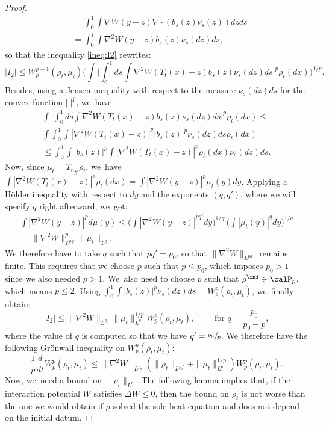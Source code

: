 \begin{proof}
\begin{align*}
& = \int_0^1 \int \nabla W(y-z) \nabla \cdot (b_s(z) \nu_s(z)) dz ds \\
& = \int_0^1 \int \nabla^2 W(y-z) b_s(z) \nu_s(dz) ds,
\end{align*}
so that the inequality \eqref{ineq:I2} rewrites:
\[
|I_2| \leq W_p^{p-1}(\rho_t, \mu_t) \bigg( \int \bigg| \int_0^1 ds \int \nabla^2 W(T_t(x) - z) b_s(z) \nu_s(dz) ds \bigg|^p \rho_t(dx)\bigg)^{1/p}.
\]
Besides, using a Jensen inequality with respect to the measure $\nu_s(dz) ds$ for the convex function $|\cdot|^p$, we~have:
\begin{multline*}
\int \bigg| \int_0^1 ds \int \nabla^2 W(T_t(x) - z) b_s(z) \nu_s(dz) ds \bigg|^p \rho_t(dx) \leq \\
\int \int_0^1 \int |\nabla^2 W(T_t(x) - z)|^p |b_s(z)|^p \nu_s(dz) ds \rho_t(dx) \\
\leq \int_0^1 \int |b_s(z)|^p \int |\nabla^2 W(T_t(x) - z)|^p \rho_t(dx) \nu_s(dz) ds.
\end{multline*}
Now, since $\mu_t = {T_t}_\# \rho_t$, we~have $\int |\nabla^2 W(T_t(x) - z)|^p \rho_t(dx) = \int |\nabla^2 W(y - z)|^p \mu_t(y) dy$. Applying a Hölder inequality with respect to $dy$ and the exponents $(q,q')$, where we will specify $q$ right afterward, we~get:
\begin{multline*}
\int |\nabla^2 W(y - z)|^p d\mu(y) \leq \bigg( \int |\nabla^2 W(y - z)|^{pq'} dy \bigg)^{1/q'} \bigg( \int |\mu_t(y)|^{q} dy \bigg)^{1/q} \\
= \|\nabla^2 W\|_{L^{pq'}}^p \|\mu_t\|_{L^q}.
\end{multline*}
We therefore have to take $q$ such that $pq' = p_0$, so that $\|\nabla^2 W\|_{L^{pq'}}$ remains finite. This requires that we choose $p$ such that $p \leq p_0$, which imposes $p_0 > 1$ since we also needed $p>1$. We~also need to choose $p$ such that $\rho^{\ini}\in\calP_p$, which means $p\leq 2$. Using $\int_0^1 \int |b_s(z)|^p \nu_s(dz) ds = W_p^p(\rho_t, \mu_t)$, we~finally obtain:
\[
|I_2| \leq \|\nabla^2 W\|_{L^{p_0}} \|\mu_t\|_{L^q}^{1/p} W_p^p(\rho_t, \mu_t),\qquad\mbox{ for } q=\frac{p_0}{p_0-p},
\]
where the value of $q$ is computed so that we have $q'=\sfrac{p_0}{p}$.
We therefore have the following Grönwall inequality on $W_p^p(\rho_t, \mu_t)$:
\begin{equation}\label{ineq:GWp}
\frac 1p \frac{d}{dt} W_p^p(\rho_t, \mu_t) \leq \|\nabla^2 W\|_{L^{p_0}} \left( \|\rho_t\|_{L^{p_0'}} + \|\mu_t\|_{L^q}^{1/p} \right) W_p^p(\rho_t, \mu_t).
\end{equation}
Now, we~need a bound on $\|\rho_t\|_{L^r}$. The following lemma implies that, if the interaction potential $W$ satisfies $\Delta W \leq 0$, then the bound on $\rho_t$ is not worse than the one we would obtain if $\rho$ solved the sole heat equation and does not depend on the initial datum.

\end{proof}
